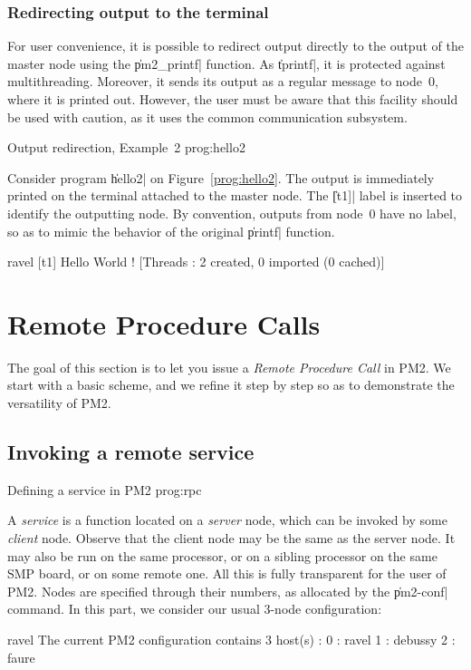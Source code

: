 \subsubsection{Redirecting output to the terminal}

For user convenience, it is possible to redirect output directly
to the output of the master node using the \|pm2_printf| function. As
\|tprintf|, it is protected against multithreading. Moreover, it sends
its output as a regular message to node~0, where it is printed out.
However, the user must be aware that this facility should be used with
caution, as it uses the common communication subsystem. 

 {Output redirection,
  Example~2} {prog:hello2}

Consider program \|hello2| on Figure~\ref{prog:hello2}. The output is
immediately printed on the terminal attached to the master node. The
\|[t1]| label is inserted to identify the outputting node. By
convention, outputs from node~0 have no label, so as to mimic the
behavior of the original \|printf| function.
\begin{shell}
ravel%
[t1] Hello World !
[Threads : 2 created, 0 imported (0 cached)]
\end{shell}


\section{Remote Procedure Calls}

The goal of this section is to let you issue a \emph{Remote Procedure
  Call} in PM2. We start with a basic scheme, and we refine it step by
  step so as to demonstrate the versatility of PM2.

\subsection{Invoking a remote service}

 {Defining a service in PM2} {prog:rpc}

A \emph{service} is a function located on a \emph{server} node, which
can be invoked by some \emph{client} node. Observe that the client
node may be the same as the server node. It may also be run on the
same processor, or on a sibling processor on the same SMP board, or on
some remote one. All this is fully transparent for the user of PM2.
Nodes are specified through their numbers, as allocated by the
\|pm2-conf| command. In this part, we consider our usual 3-node
configuration:
\begin{shell}
ravel%
The current PM2 configuration contains 3 host(s) :
0 : ravel
1 : debussy
2 : faure
\end{shell}


